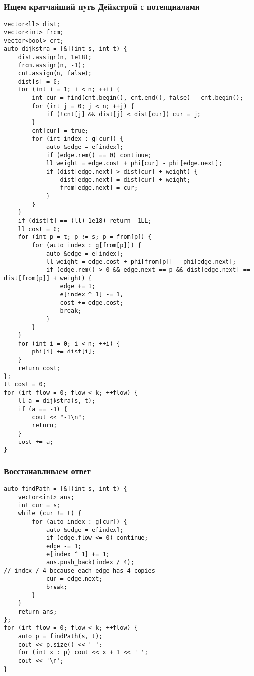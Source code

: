 \subsubsection{Ищем кратчайший путь Дейкстрой с потенциалами}
\begin{lstlisting}
vector<ll> dist;
vector<int> from;
vector<bool> cnt;
auto dijkstra = [&](int s, int t) {
    dist.assign(n, 1e18);
    from.assign(n, -1);
    cnt.assign(n, false);
    dist[s] = 0;
    for (int i = 1; i < n; ++i) {
        int cur = find(cnt.begin(), cnt.end(), false) - cnt.begin();
        for (int j = 0; j < n; ++j) {
            if (!cnt[j] && dist[j] < dist[cur]) cur = j;
        }
        cnt[cur] = true;
        for (int index : g[cur]) {
            auto &edge = e[index];
            if (edge.rem() == 0) continue;
            ll weight = edge.cost + phi[cur] - phi[edge.next];
            if (dist[edge.next] > dist[cur] + weight) {
                dist[edge.next] = dist[cur] + weight;
                from[edge.next] = cur;
            }
        }
    }
    if (dist[t] == (ll) 1e18) return -1LL;
    ll cost = 0;
    for (int p = t; p != s; p = from[p]) {
        for (auto index : g[from[p]]) {
            auto &edge = e[index];
            ll weight = edge.cost + phi[from[p]] - phi[edge.next];
            if (edge.rem() > 0 && edge.next == p && dist[edge.next] == dist[from[p]] + weight) {
                edge += 1;
                e[index ^ 1] -= 1;
                cost += edge.cost;
                break;
            }
        }
    }
    for (int i = 0; i < n; ++i) {
        phi[i] += dist[i];
    }
    return cost;
};
ll cost = 0;
for (int flow = 0; flow < k; ++flow) {
    ll a = dijkstra(s, t);
    if (a == -1) {
        cout << "-1\n";
        return;
    }
    cost += a;
}
\end{lstlisting}
\subsubsection{Восстанавливаем ответ}
\begin{lstlisting}
auto findPath = [&](int s, int t) {
    vector<int> ans;
    int cur = s;
    while (cur != t) {
        for (auto index : g[cur]) {
            auto &edge = e[index];
            if (edge.flow <= 0) continue;
            edge -= 1;
            e[index ^ 1] += 1;
            ans.push_back(index / 4);
// index / 4 because each edge has 4 copies
            cur = edge.next;
            break;
        }
    }
    return ans;
};
for (int flow = 0; flow < k; ++flow) {
    auto p = findPath(s, t);
    cout << p.size() << ' ';
    for (int x : p) cout << x + 1 << ' ';
    cout << '\n';
}
\end{lstlisting}